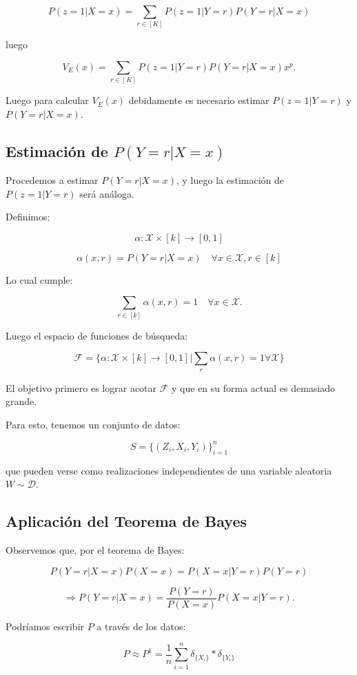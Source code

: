 \[ P(z=1|X=x) = \sum_{r \in [K]} P(z=1|Y=r) P(Y=r|X=x) \]

luego

\[ V_E(x) = \sum_{r \in [K]} P(z=1|Y=r) P(Y=r|X=x) x^p. \]

Luego para calcular \( V_E(x) \) debidamente es necesario estimar \( P(z=1|Y=r) \) y \( P(Y=r|X=x) \).

\subsection{Estimación de \( P(Y=r|X=x) \)}

Procedemos a estimar \( P(Y=r|X=x) \), y luego la estimación de \( P(z=1|Y=r) \) será análoga.

Definimos:

\[ \alpha : \mathcal{X} \times [k] \rightarrow [0,1] \]

\[ \alpha(x,r) = P(Y=r|X=x) \quad \forall x \in \mathcal{X}, r \in [k] \]

Lo cual cumple:

\[ \sum_{r \in [k]} \alpha(x,r) = 1 \quad \forall x \in \mathcal{X}. \]

Luego el espacio de funciones de búsqueda:

\[ \mathcal{F} = \Big\{ \alpha : \mathcal{X} \times [k] \rightarrow [0,1] \Big| \sum_{r} \alpha(x,r) = 1 \forall \mathcal{X} \Big\} \]

El objetivo primero es lograr acotar \( \mathcal{F} \) y que en su forma actual es demasiado grande.

Para esto, tenemos un conjunto de datos:

\[ S = \{(Z_i, X_i, Y_i)\}_{i=1}^n \]

que pueden verse como realizaciones independientes de una variable aleatoria $W \sim \mathcal{D}$.

\subsection{Aplicación del Teorema de Bayes}

Observemos que, por el teorema de Bayes:

\[ P(Y=r|X=x)P(X=x) = P(X=x|Y=r)P(Y=r) \]

\[ \Rightarrow P(Y=r|X=x) = \frac{P(Y=r)}{P(X=x)} P(X=x|Y=r). \]

Podríamos escribir \( P \) a través de los datos:

\[ P \approx P^1 = \frac{1}{n} \sum_{i=1}^n \delta_{\{X_i\}} * \delta_{\{Y_i\}} \]


